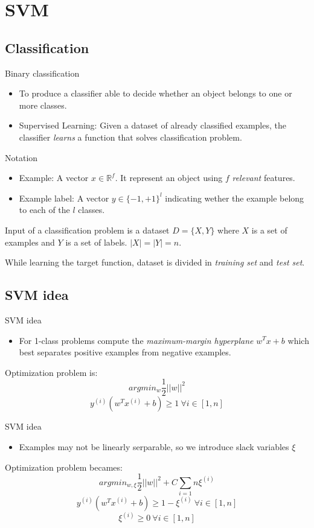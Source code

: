 \section{SVM}
\subsection{Classification}
\begin{frame}{Binary classification}
	\begin{itemize}\setlength\itemsep{1em}
		\item[Goal:]To produce a classifier able to decide whether an object belongs to one or more classes.
		\item[Idea:] Supervised Learning: Given a dataset of already classified examples, the classifier \textit{learns} a function that solves classification problem.
	\end{itemize}
\end{frame}

\begin{frame}{Notation}
	\begin{itemize}\setlength\itemsep{1em}
		\item Example: A vector $x \in \mathbb{R}^f$. It represent an object using $f$ \textit{relevant} features.
		\item Example label: A vector $y \in \{-1 , +1\}^l$ indicating wether the example belong to each of the $l$ classes.
	\end{itemize}
	Input of a classification problem is a dataset $D = \{X, Y\}$ where $X$ is a set of examples and $Y$ is a set of labels. $|X| = |Y| = n$.
	
	While learning the target function, dataset is divided in \textit{training set} and \textit{test set}.
\end{frame}

\subsection{SVM idea}

\begin{frame}{SVM idea}
	\begin{itemize}\setlength\itemsep{1em}
		\item For 1-class problems compute the \textit{maximum-margin hyperplane} $w^Tx + b$ which best separates positive examples from negative examples.
	\end{itemize}
	Optimization problem is:
	$$arg min_w \frac{1}{2} ||w||^2$$
	$$y^{(i)} (w^T x^{(i)} + b) \geq 1 \ \forall i \in [1, n]$$
\end{frame}

\begin{frame}{SVM idea}
	\begin{itemize}\setlength\itemsep{1em}
		\item Examples may not be linearly serparable, so we introduce slack variables $\xi$
	\end{itemize}
	Optimization problem becames:
	$$arg min_{w, \xi} \frac{1}{2} ||w||^2 + C \sum_{i = 1}{n}\xi^{(i)}$$
	$$y^{(i)} (w^T x^{(i)} + b) \geq 1 - \xi^{(i)} \ \forall i \in [1, n]$$
	$$\xi^{(i)} \geq 0 \ \forall i \in [1, n]$$
\end{frame}